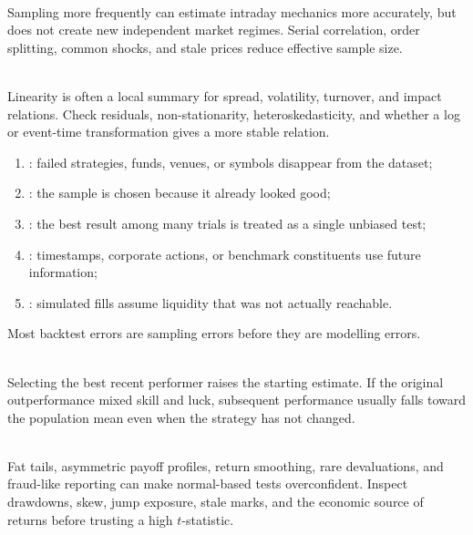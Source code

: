 \begin{caveat} \\
Sampling more frequently can estimate intraday mechanics more accurately, but does not create new independent market regimes. Serial correlation, order splitting, common shocks, and stale prices reduce effective sample size.
\end{caveat}

\begin{caveat} \\
Linearity is often a local summary for spread, volatility, turnover, and impact relations. Check residuals, non-stationarity, heteroskedasticity, and whether a log or event-time transformation gives a more stable relation.
\end{caveat}

\begin{taxonomy} 
\begin{enumerate}[label=\roman*.]
\setlength{\itemsep}{0pt}
\item {}: failed strategies, funds, venues, or symbols disappear from the dataset;
\item {}: the sample is chosen because it already looked good;
\item {}: the best result among many trials is treated as a single unbiased test;
\item {}: timestamps, corporate actions, or benchmark constituents use future information;
\item {}: simulated fills assume liquidity that was not actually reachable.
\end{enumerate}
Most backtest errors are sampling errors before they are modelling errors.
\end{taxonomy}

\begin{caveat} \\
Selecting the best recent performer raises the starting estimate. If the original outperformance mixed skill and luck, subsequent performance usually falls toward the population mean even when the strategy has not changed.
\end{caveat}

\begin{caveat} \\
Fat tails, asymmetric payoff profiles, return smoothing, rare devaluations, and fraud-like reporting can make normal-based tests overconfident. Inspect drawdowns, skew, jump exposure, stale marks, and the economic source of returns before trusting a high $t$-statistic.
\end{caveat}

